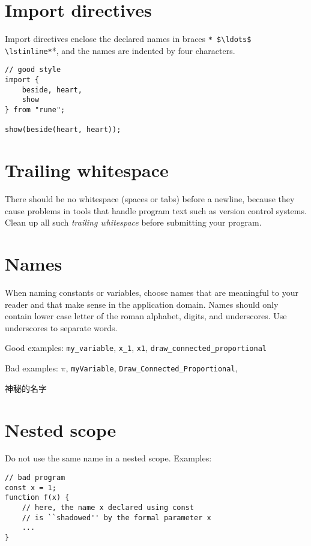 \section*{Import directives}

Import directives enclose the declared names in braces \lstinline*{* $\ldots$ \lstinline*}*, and the names are indented by four characters.

\begin{lstlisting}
// good style
import {
    beside, heart,
    show
} from "rune";

show(beside(heart, heart));
\end{lstlisting}

\section*{Trailing whitespace}

There should be no whitespace (spaces or tabs) before a newline, because they
cause problems in tools that handle program text such as version control systems.
Clean up all such \emph{trailing whitespace} before submitting your program.

\section*{Names}

When naming constants or variables, choose names that are meaningful to your
reader and that make sense in the application domain.
Names should only contain
lower case letter of the roman alphabet, digits, and
underscores. Use underscores to separate words. 

Good examples: \lstinline{my_variable}, \lstinline{x_1}, \lstinline{x1},
\lstinline{draw_connected_proportional}

Bad examples: $\pi$, \lstinline{myVariable}, \lstinline{Draw_Connected_Proportional},
\begin{CJK*}{UTF8}{gbsn}
神秘的名字
\end{CJK*}

\section*{Nested scope}
Do not use the same name in a nested scope. Examples:
\begin{lstlisting}
// bad program
const x = 1;
function f(x) {
    // here, the name x declared using const
    // is ``shadowed'' by the formal parameter x
    ...
}
\end{lstlisting}

